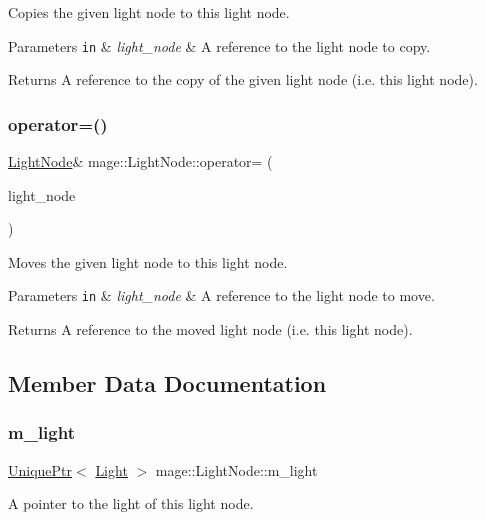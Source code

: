 Copies the given light node to this light node.


\begin{DoxyParams}[1]{Parameters}
\mbox{\tt in}  & {\em light\+\_\+node} & A reference to the light node to copy. \\
\hline
\end{DoxyParams}
\begin{DoxyReturn}{Returns}
A reference to the copy of the given light node (i.\+e. this light node). 
\end{DoxyReturn}
\hypertarget{classmage_1_1_light_node_abda92f7cf2ce3aed3af94d2278e2bfa1}{}\label{classmage_1_1_light_node_abda92f7cf2ce3aed3af94d2278e2bfa1} 
\subsubsection{\texorpdfstring{operator=()}{operator=()}\hspace{0.1cm}{\footnotesize\ttfamily [2/2]}}
{\footnotesize\ttfamily \hyperlink{classmage_1_1_light_node}{Light\+Node}\& mage\+::\+Light\+Node\+::operator= (\begin{DoxyParamCaption}\item[{\hyperlink{classmage_1_1_light_node}{Light\+Node} \&\&}]{light\+\_\+node }\end{DoxyParamCaption})\hspace{0.3cm}{\ttfamily [delete]}}

Moves the given light node to this light node.


\begin{DoxyParams}[1]{Parameters}
\mbox{\tt in}  & {\em light\+\_\+node} & A reference to the light node to move. \\
\hline
\end{DoxyParams}
\begin{DoxyReturn}{Returns}
A reference to the moved light node (i.\+e. this light node). 
\end{DoxyReturn}


\subsection{Member Data Documentation}
\hypertarget{classmage_1_1_light_node_aad97d01d2adb66eac0e93bdcdb919a05}{}\label{classmage_1_1_light_node_aad97d01d2adb66eac0e93bdcdb919a05} 
\subsubsection{\texorpdfstring{m\+\_\+light}{m\_light}}
{\footnotesize\ttfamily \hyperlink{namespacemage_a3316d7143a973e37adf1110f2e80ca31}{Unique\+Ptr}$<$ \hyperlink{classmage_1_1_light}{Light} $>$ mage\+::\+Light\+Node\+::m\+\_\+light\hspace{0.3cm}{\ttfamily [private]}}

A pointer to the light of this light node. 